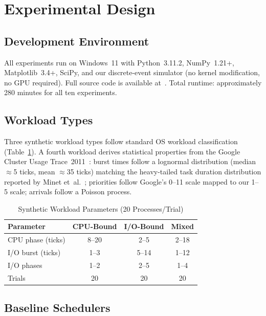 \documentclass[10pt,journal,compsoc]{IEEEtran}
\begin{document}
\section{Experimental Design}
\label{sec:experiments}

\subsection{Development Environment}

All experiments run on Windows~11 with Python~3.11.2, NumPy~1.21+,
Matplotlib~3.4+, SciPy, and our discrete-event simulator
(no kernel modification, no GPU required).
Full source code is available at~\cite{rmcts_github}.
Total runtime: approximately 280 minutes for all ten experiments.

\subsection{Workload Types}

Three synthetic workload types follow standard OS workload
classification~\cite{stallings} (Table~\ref{tab:workloads}).
A fourth workload derives statistical properties from the Google Cluster
Usage Trace~2011~\cite{reiss2011google}: burst times follow a
lognormal distribution (median $\approx$5 ticks, mean $\approx$35 ticks)
matching the heavy-tailed task duration distribution reported by
Minet et~al.~\cite{minet2018}; priorities follow Google's
0--11 scale mapped to our 1--5 scale; arrivals follow a Poisson process.

\begin{table}[!t]
\centering
\caption{Synthetic Workload Parameters (20 Processes/Trial)}
\label{tab:workloads}
\renewcommand{\arraystretch}{1.1}
\begin{tabular}{@{}l c c c@{}}
\toprule
\textbf{Parameter} & \textbf{CPU-Bound} & \textbf{I/O-Bound} & \textbf{Mixed} \\
\midrule
CPU phase (ticks) & 8--20 & 2--5  & 2--18 \\
I/O burst (ticks) & 1--3  & 5--14 & 1--12 \\
I/O phases        & 1--2  & 2--5  & 1--4 \\
Trials            & 20    & 20    & 20 \\
\bottomrule
\end{tabular}
\end{table}

\subsection{Baseline Schedulers}
\end{document}
